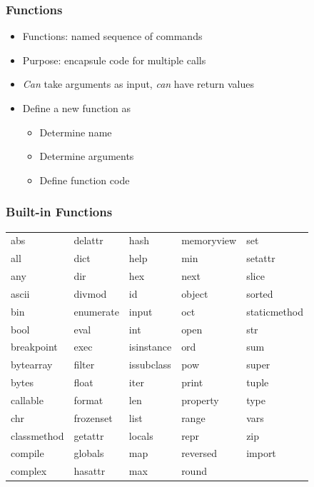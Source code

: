 \documentclass[english]{beamer}
\begin{document}
\begin{frame}
\frametitle{Functions}

\begin{itemize}
\item Functions: named sequence of commands
\item Purpose: encapsule code for multiple calls
\item \textit{Can} take arguments as input, \textit{can} have return values
\item Define a new function as
\begin{itemize}
	\item Determine name
	\item Determine arguments
	\item Define function code
	\end{itemize}
\end{itemize}
\end{frame}


\begin{frame}
\frametitle{Built-in Functions}

\begin{tabular}{lllll}
abs	&	delattr	&	hash	&	memoryview	&	set	\\
all	&	dict	&	help	&	min	&	setattr	\\
any	&	dir	&	hex	&	next	&	slice	\\
ascii	&	divmod	&	id	&	object	&	sorted	\\
bin	&	enumerate	&	input	&	oct	&	staticmethod	\\
bool	&	eval	&	int	&	open	&	str	\\
breakpoint	&	exec	&	isinstance	&	ord	&	sum	\\
bytearray	&	filter	&	issubclass	&	pow	&	super	\\
bytes	&	float	&	iter	&	print	&	tuple	\\
callable	&	format	&	len	&	property	&	type	\\
chr	&	frozenset	&	list	&	range	&	vars	\\
classmethod	&	getattr	&	locals	&	repr	&	zip	\\
compile	&	globals	&	map	&	reversed	&	\textunderscore \textunderscore import \textunderscore \textunderscore	\\
complex	&	hasattr	&	max	&	round	&		\\
\end{tabular}
\end{frame}
\end{document}
